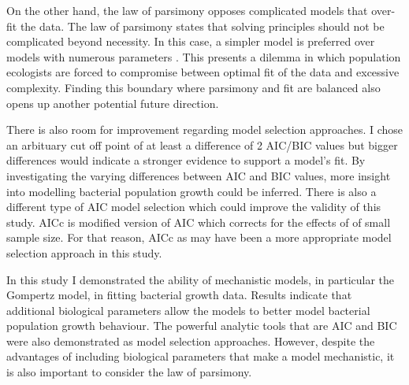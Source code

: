 \documentclass[11pt]{article}
\begin{document}
    On the other hand, the law of parsimony opposes complicated models that over-fit the data. The law of parsimony states that solving principles should not be complicated beyond necessity. In this case, a simpler model is preferred over models with numerous parameters \citep{re2002william}. This presents a dilemma in which population ecologists are forced to compromise between optimal fit of the data and excessive complexity. Finding this boundary where parsimony and fit are balanced also opens up another potential future direction.
    
     There is also room for improvement regarding model selection approaches. I chose an arbituary cut off point of at least a difference of 2 AIC/BIC values but bigger differences would indicate a stronger evidence to support a model's fit. By investigating the varying differences between AIC and BIC values, more insight into modelling bacterial population growth could be inferred. There is also a different type of AIC model selection which could improve the validity of this study. AICc is modified version of AIC which corrects for the effects of of small sample size. For that reason, AICc as may have been a more appropriate model selection approach in this study.
     
     In this study I demonstrated the ability of mechanistic models, in particular the Gompertz model, in fitting bacterial growth data. Results indicate that additional biological parameters allow the models to better model bacterial population growth behaviour. The powerful analytic tools that are AIC and BIC were also demonstrated as model selection approaches. However, despite the advantages of including biological parameters that make a model mechanistic, it is also important to consider the law of parsimony.
    
    \pagebreak
    
	
	\label{bibsect}
\end{document}

